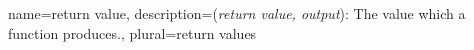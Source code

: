 \usepackage[toc]{glossaries}

\makeglossaries

{
	name={return value},
	description={(\textit{return value, output}): The value which a function produces.},
	plural={return values}
}


